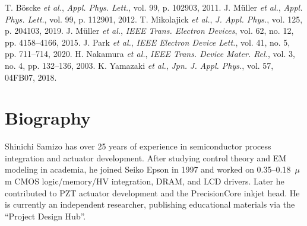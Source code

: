 \documentclass[conference]{IEEEtran}
\begin{document}
\begin{thebibliography}{1}\setlength{\itemsep}{0pt plus 0.3pt}
 T. Böscke \textit{et al.}, \textit{Appl. Phys. Lett.}, vol. 99, p. 102903, 2011.
 J. Müller \textit{et al.}, \textit{Appl. Phys. Lett.}, vol. 99, p. 112901, 2012.
 T. Mikolajick \textit{et al.}, \textit{J. Appl. Phys.}, vol. 125, p. 204103, 2019.
 J. Müller \textit{et al.}, \textit{IEEE Trans. Electron Devices}, vol. 62, no. 12, pp. 4158--4166, 2015.
 J. Park \textit{et al.}, \textit{IEEE Electron Device Lett.}, vol. 41, no. 5, pp. 711--714, 2020.
 H. Nakamura \textit{et al.}, \textit{IEEE Trans. Device Mater. Rel.}, vol. 3, no. 4, pp. 132--136, 2003.
 K. Yamazaki \textit{et al.}, \textit{Jpn. J. Appl. Phys.}, vol. 57, 04FB07, 2018.
\end{thebibliography}

\section*{Biography}
\small
Shinichi Samizo has over 25 years of experience in semiconductor process integration and actuator development. After studying control theory and EM modeling in academia, he joined Seiko Epson in 1997 and worked on 0.35--0.18~$\mu$m CMOS logic/memory/HV integration, DRAM, and LCD drivers. Later he contributed to PZT actuator development and the PrecisionCore inkjet head. He is currently an independent researcher, publishing educational materials via the ``Project Design Hub''.
\end{document}
